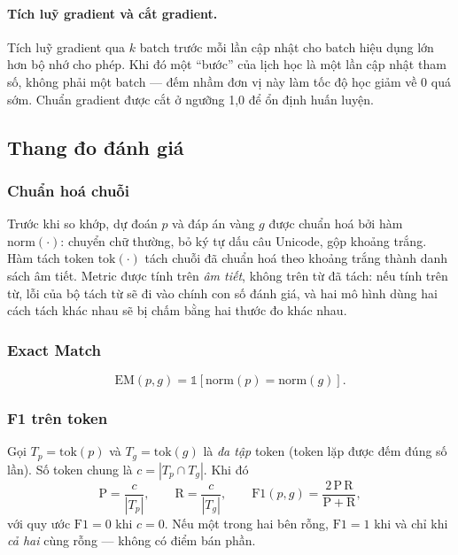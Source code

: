 \paragraph{Tích luỹ gradient và cắt gradient.} Tích luỹ gradient qua $k$ batch trước mỗi
lần cập nhật cho batch hiệu dụng lớn hơn bộ nhớ cho phép. Khi đó một ``bước'' của lịch
học là một lần cập nhật tham số, không phải một batch --- đếm nhầm đơn vị này làm tốc độ
học giảm về 0 quá sớm. Chuẩn gradient được cắt ở ngưỡng 1,0 để ổn định huấn luyện.

\subsection{Thang đo đánh giá}
\label{sec:metrics-theory}

\subsubsection{Chuẩn hoá chuỗi}

Trước khi so khớp, dự đoán $p$ và đáp án vàng $g$ được chuẩn hoá bởi hàm
$\mathrm{norm}(\cdot)$: chuyển chữ thường, bỏ ký tự dấu câu Unicode, gộp khoảng trắng.
Hàm tách token $\mathrm{tok}(\cdot)$ tách chuỗi đã chuẩn hoá theo khoảng trắng thành
danh sách âm tiết. Metric được tính trên \emph{âm tiết}, không trên từ đã tách: nếu tính trên từ, lỗi của bộ tách từ sẽ đi vào chính con số đánh giá, và hai mô hình dùng hai cách tách khác nhau sẽ bị chấm bằng hai thước đo khác nhau.

\subsubsection{Exact Match}

\begin{equation}
  \mathrm{EM}(p, g) = \mathbb{1}\left[ \mathrm{norm}(p) = \mathrm{norm}(g) \right].
\end{equation}

\subsubsection{F1 trên token}

Gọi $T_p = \mathrm{tok}(p)$ và $T_g = \mathrm{tok}(g)$ là \emph{đa tập} token (token lặp
được đếm đúng số lần). Số token chung là $c = |T_p \cap T_g|$. Khi đó
\begin{equation}
  \mathrm{P} = \frac{c}{|T_p|}, \qquad
  \mathrm{R} = \frac{c}{|T_g|}, \qquad
  \mathrm{F1}(p, g) = \frac{2\,\mathrm{P}\,\mathrm{R}}{\mathrm{P} + \mathrm{R}} ,
\end{equation}
với quy ước $\mathrm{F1} = 0$ khi $c = 0$. Nếu một trong hai bên rỗng, $\mathrm{F1} = 1$
khi và chỉ khi \emph{cả hai} cùng rỗng --- không có điểm bán phần.


